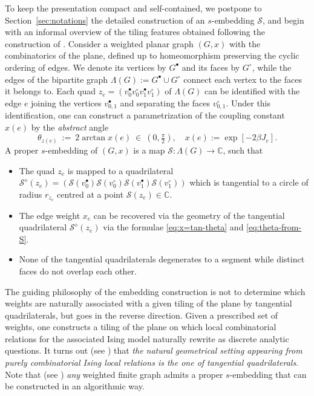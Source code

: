\documentclass[reqno]{amsart}
\numberwithin{equation}{section}
\theoremstyle{definition}
\theoremstyle{remark}
\newcommand\cS{\mathcal{S}}
\begin{document}
To keep the presentation compact and self-contained, we postpone to Section~\ref{sec:notations} the detailed construction of an $s$-embedding $\cS$, and begin with an informal overview of the tiling features obtained following the construction of \cite{Che20}. Consider a weighted planar graph $(G,x)$ with the combinatorics of the plane, defined up to homeomorphism preserving the cyclic ordering of edges. We denote its vertices by $G^{\bullet}$ and its faces by $G^{\circ}$, while the edges of the bipartite graph $\Lambda(G):=G^{\bullet}\cup G^{\circ}$ connect each vertex to the faces it belongs to. Each quad $z_e=(v^{\bullet}_{0}v^{\circ}_{0}v^{\bullet}_{1}v^{\circ}_{1})$ of $\Lambda(G)$ can be identified with the edge $e$ joining the vertices $v_{0,1}^\bullet$ and separating the faces $v_{0,1}^\circ$. Under this identification, one can construct a parametrization of the coupling constant $x(e)$ by the \emph{abstract} angle
\begin{equation}
\label{eq:x=tan-theta} \theta_{z(e)}\ :=\ 2\arctan x(e)\ \in\ (0,\tfrac{\pi}{2}), \quad x(e):=\exp[-2\beta J_e].
\end{equation}
A proper $s$-embedding of $(G,x)$ is a map $\cS :\Lambda(G) \rightarrow \mathbb{C} $, such that
\begin{itemize}
	\item The quad $z_e $ is mapped to a quadrilateral $\cS^{\diamond}(z_e)=(\cS(v^{\bullet}_{0} )\cS(v^{\circ}_{0} )\cS(v^{\bullet}_{1})\cS(v^{\circ}_{1}))$ which is tangential to a circle of radius $r_{z_e}$ centred at a point $\cS(z_e)\in \mathbb{C}$. 
	\item The edge weight $x_e$ can be recovered via the geometry of the tangential quadrilateral $\cS^{\diamond}(z_e)$ via the formulae \eqref{eq:x=tan-theta} and \eqref{eq:theta-from-S}.
	\item None of the tangential quadrilaterals degenerates to a segment while distinct faces do not overlap each other.
\end{itemize}
The guiding philosophy of the embedding construction is not to determine which weights are naturally associated with a given tiling of the plane by tangential quadrilaterals, but goes in the reverse direction. Given a prescribed set of weights, one constructs a tiling of the plane on which local combinatorial relations for the associated Ising model naturally rewrite as discrete analytic questions. It turns out (see \cite{Che20}) that \emph{the natural geometrical setting appearing from purely combinatorial Ising local relations is the one of tangential quadrilaterals}. Note that (see \cite{KLRR,Mah23,galashin2024amplituhedra}) \emph{any} weighted finite graph admits a proper $s$-embedding that can be constructed in an algorithmic way. 
\end{document}
